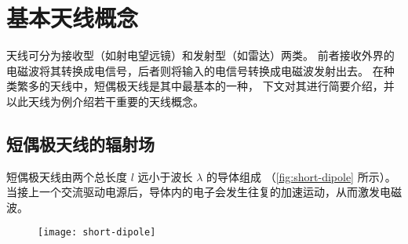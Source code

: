 \section{基本天线概念}
\label{sec:antenna}

天线可分为接收型（如射电望远镜）和发射型（如雷达）两类。
前者接收外界的电磁波将其转换成电信号，后者则将输入的电信号转换成电磁波发射出去。
在种类繁多的天线中，短偶极天线是其中最基本的一种，
下文对其进行简要介绍，并以此天线为例介绍若干重要的天线概念。

\subsection{短偶极天线的辐射场}

短偶极天线由两个总长度 $l$ 远小于波长 $\lambda$ 的导体组成
（\autoref{fig:short-dipole} 所示）。
当接上一个交流驱动电源后，导体内的电子会发生往复的加速运动，从而激发电磁波。

\begin{figure}[htp]
  \centering
  \texttt{[image: short-dipole]}
  \label{fig:short-dipole}
\end{figure}

